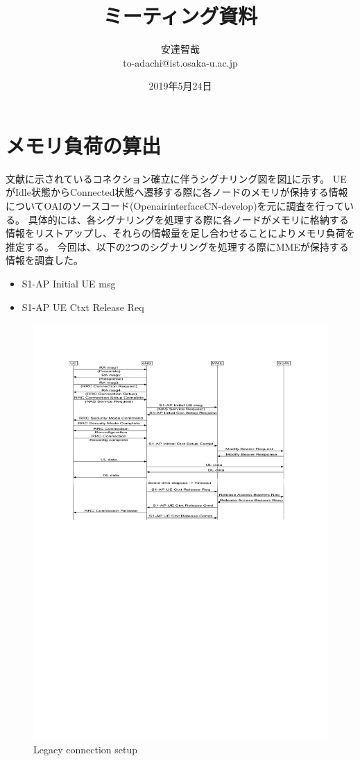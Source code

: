 \documentclass[a4j]{ujarticle}
\title{ミーティング資料}
\author{安達智哉\\to-adachi@ist.osaka-u.ac.jp}
\date{2019年5月24日}
\begin{document}
\maketitle

\section{メモリ負荷の算出}
文献\cite{3gpp.23.720}に示されているコネクション確立に伴うシグナリング図を図\ref{Legacy_connection_setup}に示す。
UEがIdle状態からConnected状態へ遷移する際に各ノードのメモリが保持する情報についてOAIのソースコード(OpenairinterfaceCN-develop)を元に調査を行っている。
具体的には、各シグナリングを処理する際に各ノードがメモリに格納する情報をリストアップし、それらの情報量を足し合わせることによりメモリ負荷を推定する。
今回は、以下の2つのシグナリングを処理する際にMMEが保持する情報を調査した。
\begin{itemize}
  \item S1-AP Initial UE msg
  \item S1-AP UE Ctxt Release Req
\end{itemize}
\begin{figure}[htbp]
  \centering
  \includegraphics[width=0.9\hsize]{Legacy_connection_setup.pdf}
  \caption{Legacy connection setup}
  \label{Legacy_connection_setup}
\end{figure}
\end{document}
